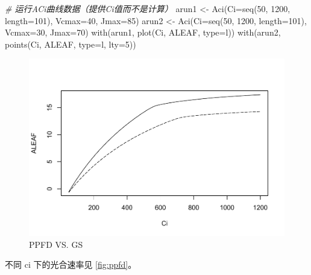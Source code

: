 \documentclass[
]{krantz}
\makeatletter
\newenvironment{Shaded}{\begin{snugshade}}{\end{snugshade}}
\newcommand{\AttributeTok}[1]{\textcolor[rgb]{0.77,0.63,0.00}{#1}}
\newcommand{\CommentTok}[1]{\textcolor[rgb]{0.56,0.35,0.01}{\textit{#1}}}
\newcommand{\DecValTok}[1]{\textcolor[rgb]{0.00,0.00,0.81}{#1}}
\newcommand{\FunctionTok}[1]{\textcolor[rgb]{0.00,0.00,0.00}{#1}}
\newcommand{\NormalTok}[1]{#1}
\newcommand{\OtherTok}[1]{\textcolor[rgb]{0.56,0.35,0.01}{#1}}
\newcommand{\StringTok}[1]{\textcolor[rgb]{0.31,0.60,0.02}{#1}}
\newenvironment{kframe}{%
\medskip{}
\setlength{\fboxsep}{.8em}
 \def\at@end@of@kframe{}%
 \ifinner\ifhmode%
  \def\at@end@of@kframe{\end{minipage}}%
  \begin{minipage}{\columnwidth}%
 \fi\fi%
 \def\FrameCommand##1{\hskip\@totalleftmargin \hskip-\fboxsep
 \colorbox{shadecolor}{##1}\hskip-\fboxsep
     \hskip-\linewidth \hskip-\@totalleftmargin \hskip\columnwidth}%
 \MakeFramed {\advance\hsize-\width
   \@totalleftmargin\z@ \linewidth\hsize
   \@setminipage}}%
 {\par\unskip\endMakeFramed%
 \at@end@of@kframe}
\renewenvironment{Shaded}{\begin{kframe}}{\end{kframe}}
\makeatother
\begin{document}
\begin{Shaded}
\begin{Highlighting}[]
\CommentTok{\# 运行ACi曲线数据（提供Ci值而不是计算）}
\NormalTok{arun1 }\OtherTok{\textless{}{-}} \FunctionTok{Aci}\NormalTok{(}\AttributeTok{Ci=}\FunctionTok{seq}\NormalTok{(}\DecValTok{50}\NormalTok{, }\DecValTok{1200}\NormalTok{, }\AttributeTok{length=}\DecValTok{101}\NormalTok{), }
             \AttributeTok{Vcmax=}\DecValTok{40}\NormalTok{, }\AttributeTok{Jmax=}\DecValTok{85}\NormalTok{)}
\NormalTok{arun2 }\OtherTok{\textless{}{-}} \FunctionTok{Aci}\NormalTok{(}\AttributeTok{Ci=}\FunctionTok{seq}\NormalTok{(}\DecValTok{50}\NormalTok{, }\DecValTok{1200}\NormalTok{, }\AttributeTok{length=}\DecValTok{101}\NormalTok{), }
             \AttributeTok{Vcmax=}\DecValTok{30}\NormalTok{, }\AttributeTok{Jmax=}\DecValTok{70}\NormalTok{)}
\FunctionTok{with}\NormalTok{(arun1, }\FunctionTok{plot}\NormalTok{(Ci, ALEAF, }\AttributeTok{type=}\StringTok{\textquotesingle{}l\textquotesingle{}}\NormalTok{))}
\FunctionTok{with}\NormalTok{(arun2, }\FunctionTok{points}\NormalTok{(Ci, ALEAF, }\AttributeTok{type=}\StringTok{\textquotesingle{}l\textquotesingle{}}\NormalTok{, }\AttributeTok{lty=}\DecValTok{5}\NormalTok{))}
\end{Highlighting}
\end{Shaded}

\begin{figure}
\centering
\includegraphics{bookdown_files/figure-latex/ppfd-2.pdf}
\caption{\label{fig:ppfd-2}PPFD VS. GS}
\end{figure}

不同 ci 下的光合速率见 \ref{fig:ppfd}。
\end{document}
